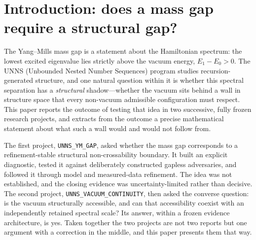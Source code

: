\documentclass[11pt,a4paper]{article}
\theoremstyle{definition}
\theoremstyle{remark}
\newcommand{\uns}{UNNS}
\begin{document}
\setcounter{tocdepth}{1}\tableofcontents
\newpage

\section{Introduction: does a mass gap require a structural gap?}\label{sec:intro}

The Yang--Mills mass gap is a statement about the Hamiltonian spectrum: the lowest excited eigenvalue lies strictly above the vacuum energy, $E_1-E_0>0$. The \uns{} (Unbounded Nested Number Sequences) program studies recursion-generated structure, and one natural question within it is whether this spectral separation has a \emph{structural} shadow---whether the vacuum sits behind a wall in structure space that every non-vacuum admissible configuration must respect. This paper reports the outcome of testing that idea in two successive, fully frozen research projects, and extracts from the outcome a precise mathematical statement about what such a wall would and would not follow from.

The first project, \texttt{UNNS\_YM\_GAP}, asked whether the mass gap corresponds to a refinement-stable structural non-crossability boundary. It built an explicit diagnostic, tested it against deliberately constructed gapless adversaries, and followed it through model and measured-data refinement. The idea was not established, and the closing evidence was uncertainty-limited rather than decisive. The second project, \texttt{UNNS\_VACUUM\_CONTINUITY}, then asked the converse question: is the vacuum structurally accessible, and can that accessibility coexist with an independently retained spectral scale? Its answer, within a frozen evidence architecture, is yes. Taken together the two projects are not two reports but one argument with a correction in the middle, and this paper presents them that way.
\end{document}
